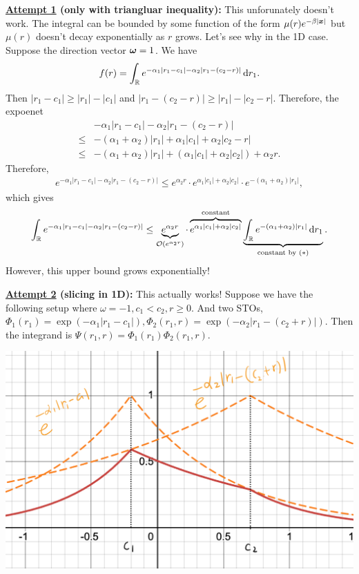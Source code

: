 \documentclass[12pt]{article}
\begin{document}
\textbf{\underline{Attempt 1} (only with triangluar inequality):} This unforunately doesn't work. The integral can be bounded by some function of the form \(\mu(r)e^{-\beta|\bm{x}|}\) but \(\mu(r)\) doesn't decay exponentially as \(r\) grows. Let's see why in the 1D case. Suppose the direction vector \(\bm{\omega} = 1\). We have
\begin{align*}
    f(r) = \int_{\mathbb {R}} e^{-\alpha_1|r_1 - c_1| - \alpha_2 |r_1 - (c_2 - r)| } \mathop{}\!\mathrm{d} r_1.
\end{align*}
Then \(|r_1 - c_1| \geq |r_1| - |c_1|\) and \(|r_1 - (c_2 - r)| \geq |r_1| - |c_2 - r|\).
Therefore, the expoenet
\begin{align*}
    &-\alpha_1|r_1 - c_1| - \alpha_2 |r_1 - (c_2 - r)| \\
    \leq& -(\alpha_1 + \alpha_2)|r_1| + \alpha_1|c_1| + \alpha_2|c_2 - r|  \\
    \leq& -(\alpha_1 + \alpha_2)|r_1| + (\alpha_1|c_1| + \alpha_2|c_2|) + \alpha_2 r.
\end{align*}
Therefore,
\begin{align*}
    e^{-\alpha_1|r_1 - c_1| - \alpha_2 |r_1 - (c_2 - r)|} \leq e^{\alpha_2 r} \cdot e^{\alpha_1|c_1| + \alpha_2|c_2|}\cdot e^{-(\alpha_1 + \alpha_2)|r_1|},
\end{align*}
which gives
\begin{align*}
    \int_{\mathbb {R}}  e^{-\alpha_1|r_1 - c_1| - \alpha_2 |r_1 - (c_2 - r)|}
    \leq 
    \underbrace{e^{\alpha_2 r}}_{\mathcal{O}(e^{\alpha_2r})}
    \cdot 
    \overbrace{e^{\alpha_1|c_1| + \alpha_2|c_2|}}^{\text{constant}} 
    \underbrace{\int_{\mathbb {R}} e^{-(\alpha_1 + \alpha_2)|r_1|} \mathop{}\!\mathrm{d} r_1}_{\text{constant by }(\ast)}.
\end{align*}
However, this upper bound grows exponentially!

\textbf{\underline{Attempt 2} (slicing in 1D):} This actually works!
Suppose we have the following setup where \(\omega = -1, c_1 < c_2, r \geq 0\). And two STOs, \(\Phi_1(r_1) = \exp(-\alpha_1|r_1-c_1|), \Phi_2(r_1,r) = \exp(-\alpha_2|r_1 - (c_2 + r)|)\).
Then the integrand is \(\Psi(r_1,r) = \Phi_1(r_1) \Phi_2(r_1,r)\). 

\begin{center}
    \includegraphics[scale=0.21]{figure1.jpeg}
\end{center}
\end{document}
